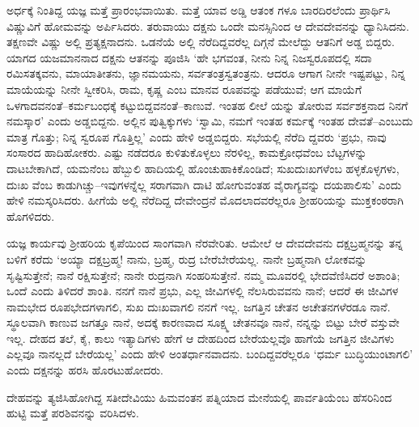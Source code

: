 ಅರ್ಧಕ್ಕೆ ನಿಂತಿದ್ದ ಯಜ್ಞ ಮತ್ತೆ ಪ್ರಾರಂಭವಾಯಿತು. ಮತ್ತೆ ಯಾವ ಅಡ್ಡಿ ಆತಂಕ ಗಳೂ ಬಾರದಿರಲೆಂದು ಪ್ರಾರ್ಥಿಸಿ ವಿಷ್ಣುವಿಗೆ ಹೋಮವನ್ನು ಅರ್ಪಿಸಿದರು. ತರುವಾಯು ದಕ್ಷನು ಒಂದೇ ಮನಸ್ಸಿನಿಂದ ಆ ದೇವದೇವನನ್ನು ಧ್ಯಾನಿಸಿದನು. ತಕ್ಷಣವೇ ವಿಷ್ಣು ಅಲ್ಲಿ ಪ್ರತ್ಯಕ್ಷನಾದನು. ಒಡನೆಯೆ ಅಲ್ಲಿ ನೆರೆದಿದ್ದವರೆಲ್ಲ ದಿಗ್ಗನೆ ಮೇಲೆದ್ದು ಆತನಿಗೆ ಅಡ್ಡ ಬಿದ್ದರು. ಯಾಗದ ಯಜಮಾನನಾದ ದಕ್ಷನು ಆತನನ್ನು ಪೂಜಿಸಿ ‘ಹೇ ಭಗವಂತ, ನೀನು ನಿನ್ನ ನಿಜಸ್ವರೂಪದಲ್ಲಿ ಸದಾ ರಮಿಸತಕ್ಕವನು, ಮಾಯಾತೀತನು, ಜ್ಞಾನಮಯನು, ಸರ್ವತಂತ್ರಸ್ವತಂತ್ರನು. ಆದರೂ ಆಗಾಗ ನೀನೇ ಇಷ್ಟಪಟ್ಟು, ನಿನ್ನ ಮಾಯೆಯನ್ನು ನೀನೇ ಸ್ವೀಕರಿಸಿ, ರಾಮ, ಕೃಷ್ಣ ಎಂಬ ಮಾನವ ರೂಪವನ್ನು ಪಡೆಯುವೆ; ಆಗ ಮಾಯೆಗೆ ಒಳಗಾದವನಂತೆ–ಕರ್ಮಬಂಧಕ್ಕೆ ಕಟ್ಟುಬಿದ್ದವನಂತೆ–ಕಾಣುವೆ. ಇಂತಹ ಲೀಲೆ ಯನ್ನು ತೋರುವ ಸರ್ವಶಕ್ತನಾದ ನಿನಗೆ ನಮಸ್ಕಾರ’ ಎಂದು ಅಡ್ಡಬಿದ್ದನು. ಅಲ್ಲಿನ ಪುತ್ವಿಕ್ಕುಗಳು ‘ಸ್ವಾಮಿ, ನಮಗೆ ಇಂತಹ ಕರ್ಮಕ್ಕೆ ಇಂತಹ ದೇವತೆ–ಎಂಬುದು ಮಾತ್ರ ಗೊತ್ತು; ನಿನ್ನ ಸ್ವರೂಪ ಗೊತ್ತಿಲ್ಲ’ ಎಂದು ಹೇಳಿ ಅಡ್ಡಬಿದ್ದರು. ಸಭೆಯಲ್ಲಿ ನೆರೆದಿ ದ್ದವರು ‘ಪ್ರಭು, ನಾವು ಸಂಸಾರದ ಹಾದಿಹೋಕರು. ಎಷ್ಟು ನಡೆದರೂ ಕುಳಿತುಕೊಳ್ಳಲು ನೆರಳಿಲ್ಲ, ಕಾಮಕ್ರೋಧವೆಂಬ ಬೆಟ್ಟಗಳನ್ನು ದಾಟಬೇಕಾಗಿದೆ, ಯಮನೆಂಬ ಹೆಬ್ಬುಲಿ ಹಾದಿಯಲ್ಲಿ ಹೊಂಚುಹಾಕಿಕೊಂಡಿದೆ; ಸುಖದುಃಖಗಳೆಂಬ ಹಳ್ಳಕೊಳ್ಳಗಳು, ದುಃಖ ವೆಂಬ ಕಾಡುಗಿಚ್ಚು–ಇವುಗಳನ್ನೆಲ್ಲ ಸರಾಗವಾಗಿ ದಾಟಿ ಹೋಗುವಂತಹ ವೈರಾಗ್ಯವನ್ನು ದಯಪಾಲಿಸು’ ಎಂದು ಹೇಳಿ ನಮಸ್ಕರಿಸಿದರು. ಹೀಗೆಯೆ ಅಲ್ಲಿ ನೆರೆದಿದ್ದ ದೇವೇಂದ್ರನೆ ಮೊದಲಾದವರೆಲ್ಲರೂ ಶ್ರೀಹರಿಯನ್ನು ಮುಕ್ತಕಂಠರಾಗಿ ಹೊಗಳಿದರು.

ಯಜ್ಞ ಕಾರ್ಯವು ಶ್ರೀಹರಿಯ ಕೃಪೆಯಿಂದ ಸಾಂಗವಾಗಿ ನೆರವೇರಿತು. ಆಮೇಲೆ ಆ ದೇವದೇವನು ದಕ್ಷಬ್ರಹ್ಮನನ್ನು ತನ್ನ ಬಳಿಗೆ ಕರೆದು ‘ಅಯ್ಯಾ ದಕ್ಷಬ್ರಹ್ಮ! ನಾನು, ಬ್ರಹ್ಮ, ರುದ್ರ ಬೇರೆಬೇರೆಯಲ್ಲ. ನಾನೇ ಬ್ರಹ್ಮನಾಗಿ ಲೋಕವನ್ನು ಸೃಷ್ಟಿಸುತ್ತೇನೆ; ನಾನೆ ರಕ್ಷಿಸುತ್ತೇನೆ; ನಾನೇ ರುದ್ರನಾಗಿ ಸಂಹರಿಸುತ್ತೇನೆ. ನಮ್ಮ ಮೂವರಲ್ಲಿ ಭೇದವೆಣಿಸಿದರೆ ಅಶಾಂತಿ; ಒಂದೆ ಎಂದು ತಿಳಿದರೆ ಶಾಂತಿ. ನನಗೆ ನಾನೆ ಪ್ರಭು, ಎಲ್ಲ ಜೀವಿಗಳಲ್ಲಿ ನೆಲಸಿರುವವನು ನಾನೆ; ಆದರೆ ಈ ಜೀವಿಗಳ ನಾಮಭೇದ ರೂಪಭೇದಗಳಾಗಲಿ, ಸುಖ ದುಃಖವಾಗಲಿ ನನಗೆ ಇಲ್ಲ. ಜಗತ್ತಿನ ಚೇತನ ಅಚೇತನಗಳೆರಡೂ ನಾನೆ. ಸ್ಥೂಲವಾಗಿ ಕಾಣುವ ಜಗತ್ತೂ ನಾನೆ, ಅದಕ್ಕೆ ಕಾರಣವಾದ ಸೂಕ್ಷ್ಮ ಚೇತನವೂ ನಾನೆ, ನನ್ನನ್ನು ಬಿಟ್ಟು ಬೇರೆ ವಸ್ತುವೇ ಇಲ್ಲ. ದೇಹದ ತಲೆ, ಕೈ, ಕಾಲು ಇತ್ಯಾದಿಗಳು ಹೇಗೆ ಆ ದೇಹದಿಂದ ಬೇರೆಯಲ್ಲವೊ ಹಾಗೆಯೆ ಜಗತ್ತಿನ ಜೀವಿಗಳು ಎಲ್ಲವೂ ನಾನಲ್ಲದೆ ಬೇರೆಯಲ್ಲ’ ಎಂದು ಹೇಳಿ ಅಂತರ್ಧಾನವಾದನು. ಬಂದಿದ್ದವರೆಲ್ಲರೂ ‘ಧರ್ಮ ಬುದ್ಧಿಯುಂಟಾಗಲಿ’ ಎಂದು ದಕ್ಷನನ್ನು ಹರಸಿ ಹೊರಟುಹೋದರು.

ದೇಹವನ್ನು ತ್ಯಜಿಸಿಹೋಗಿದ್ದ ಸತೀದೇವಿಯು ಹಿಮವಂತನ ಪತ್ನಿಯಾದ ಮೇನೆಯಲ್ಲಿ ಪಾರ್ವತಿಯೆಂಬ ಹೆಸರಿನಿಂದ ಹುಟ್ಟಿ ಮತ್ತೆ ಪರಶಿವನನ್ನು ವರಿಸಿದಳು.

